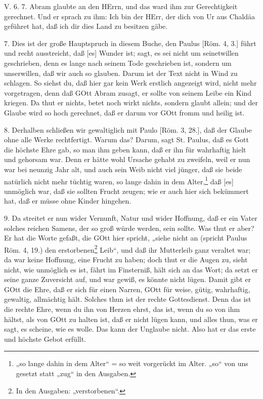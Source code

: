 \begin{schriftzitat}
V. 6. 7. Abram glaubte an den HErrn, und das ward ihm zur Gerechtigkeit gerechnet. Und
er sprach zu ihm: Ich bin der HErr, der dich von Ur aus Chaldäa geführet hat, daß ich dir dies Land zu besitzen gäbe.
\end{schriftzitat}

7. Dies ist der große Hauptspruch in diesem Buche, den Paulus [Röm. 4, 3.] führt und recht ausstreicht, daß [es] Wunder ist; sagt, es sei nicht um seinetwillen geschrieben, denn es lange nach seinem Tode geschrieben ist, sondern um unserwillen, daß wir auch so glauben. Darum ist der Text nicht in Wind zu schlagen. So siehst du, daß hier gar kein Werk erstlich angezeigt wird, nicht mehr vorgetragen, denn daß GOtt Abram zusagt, er sollte von seinem Leibe ein Kind kriegen. Da thut er nichts, betet noch wirkt nichts, sondern glaubt allein; und der Glaube wird so hoch gerechnet, daß er darum vor GOtt fromm und heilig ist.

8. Derhalben schließen wir gewaltiglich mit Paulo [Röm. 3, 28.], daß der Glaube ohne alle Werke rechtfertigt. Warum das? Darum, sagt St. Paulus, daß es Gott die höchste Ehre gab, so man ihm geben kann, daß er ihn für wahrhaftig hielt und gehorsam war. Denn er hätte wohl Ursache gehabt zu zweifeln, weil er nun war bei neunzig Jahr alt, und auch sein Weib nicht viel jünger, daß sie beide natürlich nicht mehr tüchtig waren, so lange dahin in dem Alter,\footnote{„so lange dahin in dem Alter“ = so weit vorgerückt im Alter. „so“ von uns gesetzt statt „zug“ in den Ausgaben.} daß [es] unmöglich war, daß sie sollten Frucht zeugen; wie er auch hier sich bekümmert hat, daß er müsse ohne Kinder hingehen.

9. Da streitet er nun wider Vernunft, Natur und wider Hoffnung, daß er ein Vater solches reichen Samens, der so groß würde werden, sein sollte. Was thut er aber? Er hat die Worte gefaßt, die GOtt hier spricht, „siehe nicht an (spricht Paulus Röm. 4, 19.) den erstorbenen\footnote{In den Ausgaben: „verstorbenen“.} Leib“, und daß ihr Mutterleib ganz veraltet war; da war keine Hoffnung, eine Frucht zu haben; doch thut er die Augen zu, sieht nicht, wie unmöglich es ist, fährt im Finsterniß, hält sich an das Wort; da setzt er seine ganze Zuversicht auf, und war gewiß, es könnte nicht lügen. Damit gibt er GOtt die Ehre, daß er sich für einen Narren, GOtt für weise, gütig, wahrhaftig, gewaltig, allmächtig hält. Solches thun ist der rechte Gottesdienst. Denn das ist die rechte Ehre, wenn du ihn von Herzen ehrst, das ist, wenn du so von ihm hältst, als von GOtt zu halten ist, daß er nicht lügen kann, und alles thun, was er sagt, es scheine, wie es wolle. Das kann der Unglaube nicht. Also hat er das erste und höchste Gebot erfüllt.



